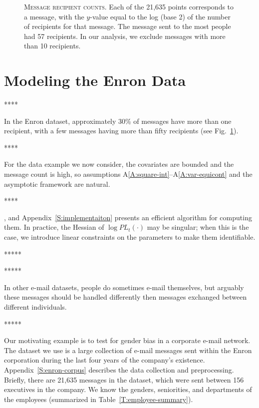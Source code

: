 \documentclass[aoas,preprint]{imsart}
\begin{document}
\begin{figure}
    \caption{
        \textsc{Message recipient counts.}
        Each of the 21,635 points corresponds to a message, with the
        $y$-value equal to the log (base 2) of the number of recipients
        for that message.  The message sent to the most people
        had 57 recipients.  In our analysis, we exclude messages with more
        than 10 recipients.
    }\label{F:recipient-counts}
\end{figure}



\section{Modeling the Enron Data}\label{S:enron-modeling}

****

 In the Enron dataset,
approximately 30\% of messages have more than one recipient, with
a few messages having more than fifty recipients
(see Fig.~\ref{F:recipient-counts}).  

****

For the data example we now consider,
the covariates are bounded and the message count is high, so
assumptions A\ref{A:square-int}--A\ref{A:var-equicont} and
the asymptotic framework are natural.

****

, and Appendix~\ref{S:implementaiton} presents
an efficient algorithm for computing them.  In practice, the
Hessian of $\log \mathit{PL}_t(\cdot)$ may be singular; when this is
the case, we introduce linear constraints on the parameters to make
them identifiable.

*****


*****

    In other e-mail datasets, people
    do sometimes e-mail themselves, but arguably these messages should be
    handled differently then messages exchanged between different individuals.

*****

Our motivating example is to test for gender bias in a corporate e-mail
network.  The dataset we use is a large collection of e-mail messages sent
within the Enron corporation during the last four years of the company's
existence.  Appendix~\ref{S:enron-corpus} describes the data collection and
preprocessing.  Briefly, there are 21,635 messages in the dataset, which
were sent between 156 executives in the company.  We know the genders,
seniorities, and departments of the employees (summarized in
Table~\ref{T:employee-summary}).
\end{document}
